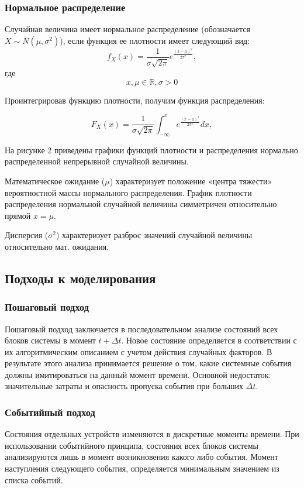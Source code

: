 

\subsubsection*{Нормальное распределение}

Случайная величина имеет нормальное распределение (обозначается $X \sim N(\mu, \sigma^2)$), если функция ее плотности имеет следующий вид:
$$
f_{X} (x) = \frac{1}{\sigma\sqrt{2\pi}}e^{\frac{(x - \mu)^2}{2\sigma^2}},
$$
где
$$x, \mu \in \mathbb{R}, \sigma > 0$$

Проинтегрировав функцию плотности, получим функция распределения:

$$
F_{X} (x) = \frac{1}{\sigma\sqrt{2\pi}} \int_{-\infty}^{x}{e^{\frac{(x - \mu)^2}{2\sigma^2}}dx},
$$

На рисунке 2 приведены графики функций плотности и распределения нормально распределенной непрерывной случайной величины.




Математическое ожидание ($\mu$) характеризует положение «центра
тяжести» вероятностной массы нормального распределения. График плотности распределения нормальной случайной величины симметричен относительно прямой $x = \mu$.

Дисперсия ($\sigma^2$) характеризует разброс значений случайной величины
относительно мат. ожидания.



\subsection*{Подходы к моделирования}
\subsubsection*{Пошаговый подход}
Пошаговый подход заключается в последовательном анализе состояний всех блоков системы
в момент $t + \Delta t$. Новое состояние определяется в соответствии с их
алгоритмическим описанием с учетом действия случайных факторов. В
результате этого анализа принимается решение о том, какие системные события
должны имитироваться на данный момент времени. Основной недостаток:
значительные затраты и опасность пропуска события при больших  $\Delta t$.

\subsubsection*{Событийный подход}
Состояния отдельных устройств изменяются в дискретные моменты
времени. При использовании событийного принципа, состояния всех блоков
системы анализируются лишь в момент возникновения какого либо события.
Момент наступления следующего события, определяется минимальным
значением из списка событий.



